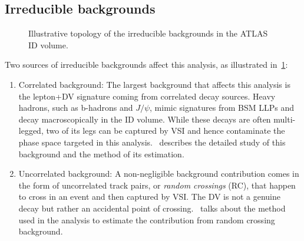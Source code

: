 \subsection{Irreducible backgrounds}

\begin{figure}[!ht]
    \centering
     \caption{Illustrative topology of the irreducible backgrounds in the ATLAS ID volume.}
     \label{fig:bkg_irreducible}
\end{figure}

Two sources of irreducible backgrounds affect this analysis, as illustrated in~\cref{fig:bkg_irreducible}:
\begin{enumerate}
    \item Correlated background: The largest background that affects this analysis is the lepton+DV signature coming from correlated decay sources. Heavy hadrons, such as b-hadrons and $J/\psi$, mimic signatures from BSM LLPs and decay macroscopically in the ID volume. While these decays are often multi-legged, two of its legs can be captured by VSI and hence contaminate the phase space targeted in this analysis.~ describes the detailed study of this background and the method of its estimation.

    \item Uncorrelated background: A non-negligible background contribution comes in the form of uncorrelated track pairs, or \textit{random crossings} (RC), that happen to cross in an event and then captured by VSI. The DV is not a genuine decay but rather an accidental point of crossing.~ talks about the method used in the analysis to estimate the contribution from random crossing background.
\end{enumerate}

